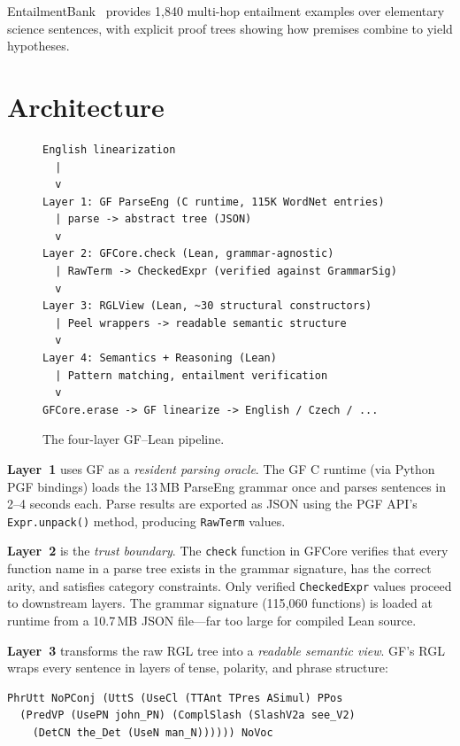 \documentclass[]{article}
\newcommand{\code}[1]{\texttt{#1}}
\newcommand{\GFCore}{\textup{GFCore}}
\begin{document}
EntailmentBank~\cite{dalvi2021entailmentbank} provides 1{,}840 multi-hop
entailment examples over elementary science sentences, with explicit
proof trees showing how premises combine to yield hypotheses.

\section{Architecture}
\label{sec:architecture}

\begin{figure}[h]
\begin{lstlisting}
English linearization
  |
  v
Layer 1: GF ParseEng (C runtime, 115K WordNet entries)
  | parse -> abstract tree (JSON)
  v
Layer 2: GFCore.check (Lean, grammar-agnostic)
  | RawTerm -> CheckedExpr (verified against GrammarSig)
  v
Layer 3: RGLView (Lean, ~30 structural constructors)
  | Peel wrappers -> readable semantic structure
  v
Layer 4: Semantics + Reasoning (Lean)
  | Pattern matching, entailment verification
  v
GFCore.erase -> GF linearize -> English / Czech / ...
\end{lstlisting}
\caption{The four-layer GF--Lean pipeline.}
\label{fig:pipeline}
\end{figure}

\textbf{Layer~1} uses GF as a \emph{resident parsing oracle}. The
GF C runtime (via Python PGF bindings) loads the 13\,MB ParseEng
grammar once and parses sentences in 2--4 seconds each. Parse results
are exported as JSON using the PGF API's \code{Expr.unpack()} method,
producing \code{RawTerm} values.

\textbf{Layer~2} is the \emph{trust boundary}. The \code{check} function
in \GFCore{} verifies that every function name in a parse tree exists in
the grammar signature, has the correct arity, and satisfies category
constraints. Only verified \code{CheckedExpr} values proceed to
downstream layers. The grammar signature (115{,}060 functions) is loaded
at runtime from a 10.7\,MB JSON file---far too large for compiled
Lean source.

\textbf{Layer~3} transforms the raw RGL tree into a \emph{readable
semantic view}. GF's RGL wraps every sentence in layers of tense,
polarity, and phrase structure:

\begin{lstlisting}
PhrUtt NoPConj (UttS (UseCl (TTAnt TPres ASimul) PPos
  (PredVP (UsePN john_PN) (ComplSlash (SlashV2a see_V2)
    (DetCN the_Det (UseN man_N)))))) NoVoc
\end{lstlisting}
\end{document}
